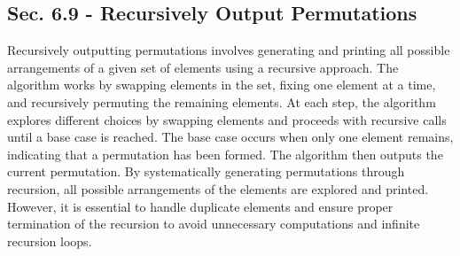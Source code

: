 \subsection*{Sec. 6.9 - Recursively Output Permutations}

Recursively outputting permutations involves generating and printing all possible arrangements of a given set of elements using a recursive approach. The algorithm works by swapping elements in the set, fixing one element at a time, and recursively permuting the remaining elements. At each step, the algorithm explores different choices by swapping 
elements and proceeds with recursive calls until a base case is reached. The base case occurs when only one element remains, indicating that a permutation has been formed. The algorithm then outputs the current permutation. By systematically generating permutations through recursion, all possible arrangements of the elements are explored and printed. 
However, it is essential to handle duplicate elements and ensure proper termination of the recursion to avoid unnecessary computations and infinite recursion loops.

